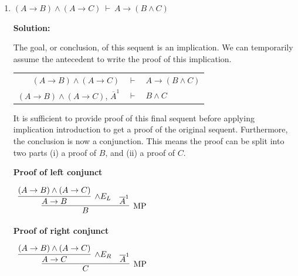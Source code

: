 \documentclass[11pt]{report}
\newcommand{\temp}[2]{{\overline{#2}}^{#1}}
\begin{document}
\begin{enumerate}
\begin{enumerate}
		It is sufficient to provide proof of this final sequent before applying implication introductions to get a proof of the original sequent.

		\begin{center}
			$\begin{array}{c}
				\infer[\to I, 1]{(C \to A) \to (C \to B)}
					{\infer[\to I, 2]{C \to B}
						{\infer[\MP]{B}
							{\infer[\MP]{A}
								{\temp{2}{C}
								&
								\temp{1}{C \to A}}
							&
							A \to B}}}
			\end{array}$

		\end{center}
	
		\item $(A \to B) \land (A \to C) \ \vdash \ A \to (B \land C)$
		
		\textbf{Solution:}

		The goal, or conclusion, of this sequent is an implication. We can temporarily assume the antecedent to write the proof of this implication. 

		\begin{center}
			\begin{tabular}{r c l}
				$(A \to B) \land (A \to C)$ & $\vdash$ & $A \to (B \land C)$ \\
				$(A \to B) \land (A \to C)$, $\temp{1}{A}$ & $\vdash$ & $B \land C$
			\end{tabular}
		\end{center}

		It is sufficient to provide proof of this final sequent before applying implication introduction to get a proof of the original sequent. Furthermore, the conclusion is now a conjunction. This means the proof can be split into two parts (i) a proof of $B$, and (ii) a proof of $C$. 

		\textbf{Proof of left conjunct}

		\begin{center}
			$\begin{array}{c} 
				\infer[\MP]{B}
					{\infer[\land E_{L}]{A \to B}{(A \to B) \land (A \to C)}
					&
					\temp{1}{A}}
			\end{array}$
		\end{center}

		\textbf{Proof of right conjunct}

		\begin{center}
			$\begin{array}{c} 
				\infer[\MP]{C}
					{\infer[\land E_{R}]{A \to C}{(A \to B) \land (A \to C)}
					&
					\temp{1}{A}}
			\end{array}$
		\end{center}		


\end{enumerate}
\end{enumerate}
\end{document}
